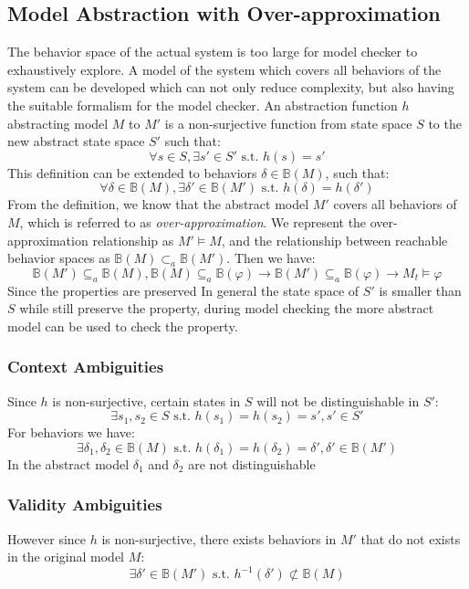 \documentclass{llncs}
\begin{document}
\subsection{Model Abstraction with Over-approximation}
The behavior space of the actual system is too large for model checker to exhaustively explore. A model of the system which covers all behaviors of the system can be developed which can not only reduce complexity, but also having the suitable formalism for the model checker. An abstraction function $h$ abstracting model $M$ to $M'$ is a non-surjective function from state space $S$ to the new abstract state space $S'$ such that: 
$$\forall s\in S, \exists s'\in S' \text{ s.t. } h(s)=s'$$
This definition can be extended to behaviors $\delta\in \mathbb{B}(M)$, such that:
$$\forall \delta\in \mathbb{B}(M),\exists \delta'\in\mathbb{B}(M')\text{ s.t. } h(\delta)=h(\delta')$$
From the definition, we know that the abstract model $M'$ covers all behaviors of $M$, which is referred to as \emph{over-approximation}. We represent the over-approximation relationship as $M'\models M$, and the relationship between reachable behavior spaces as $\mathbb{B}(M)\subset_a\mathbb{B}(M')$. Then we have:
$$\mathbb{B}(M')\subseteq_a \mathbb{B}(M),\mathbb{B}(M)\subseteq_a \mathbb{B}(\varphi)\rightarrow\mathbb{B}(M')\subseteq_a \mathbb{B}(\varphi)\rightarrow M_t\models\varphi$$
Since the properties are preserved In general the state space of $S'$ is smaller than $S$ while still preserve the property, during model checking the more abstract model can be used to check the property. 

\subsubsection{Context Ambiguities}
Since $h$ is non-surjective, certain states in $S$ will not be distinguishable in $S'$:
$$\exists s_1,s_2\in S \text{ s.t. }h(s_1)=h(s_2)=s',s'\in S'$$
For behaviors we have:
$$\exists \delta_1,\delta_2\in \mathbb{B}(M) \text{ s.t. }h(\delta_1)=h(\delta_2)=\delta',\delta'\in \mathbb{B}(M')$$
In the abstract model $\delta_1$ and $\delta_2$ are not distinguishable
\subsubsection{Validity Ambiguities}
However since $h$ is non-surjective, there exists behaviors in $M'$ that do not exists in the original model $M$:
$$\exists\delta'\in\mathbb{B}(M')\text{ s.t. }h^{-1}(\delta')\not\subset\mathbb{B}(M)$$
\end{document}
